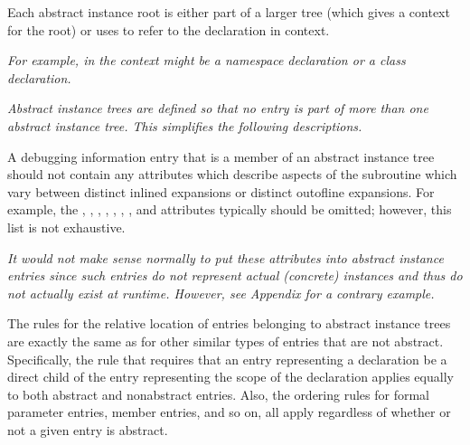 Each abstract instance root is either part of a larger
tree (which gives a context for the root) or 
uses
to refer to the declaration in context.

\textit{For example, in  the context might be a namespace
declaration or a class declaration.}

\textit{Abstract instance trees are defined so that no entry is part
of more than one abstract instance tree. This simplifies the
following descriptions.}

A debugging information entry that is a member of an abstract
instance tree should not contain any attributes which describe
aspects of the subroutine which vary between distinct inlined
expansions or distinct out\dash of\dash line expansions. For example,
the ,
, 
, 
, 
,
, , 
and 
attributes 
typically 
should 
be 
omitted; 
however, 
this 
list
is not exhaustive.

\textit{It would not make sense normally to put these attributes into
abstract instance entries since such entries do not represent
actual (concrete) instances and thus do not actually exist at
run\dash time.  However, 
see Appendix  
for a contrary example.}

The rules for the relative location of entries belonging to
abstract instance trees are exactly the same as for other
similar types of entries that are not abstract. Specifically,
the rule that requires that an entry representing a declaration
be a direct child of the entry representing the scope of the
declaration applies equally to both abstract and non\dash abstract
entries. Also, the ordering rules for formal parameter entries,
member entries, and so on, all apply regardless of whether
or not a given entry is abstract.


